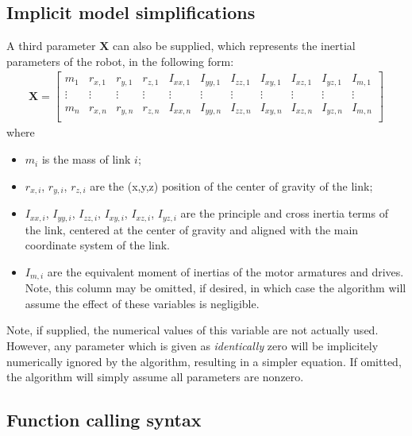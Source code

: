 \documentclass[12pt]{article}
\renewcommand{\b}[1]{\mathbf{#1}}
\begin{document}
\subsection{Implicit model simplifications}
A third parameter $\mathbf{X}$ can also be supplied, which represents the inertial parameters of the robot, in the following form:
\begin{align}
	\b{X} = \begin{bmatrix}
		m_1 & r_{x,1} & r_{y,1} & r_{z,1} & I_{xx,1} & I_{yy,1} & I_{zz,1} & I_{xy,1} & I_{xz,1} & I_{yz,1} & I_{m,1}\\
		\vdots &\vdots &\vdots &\vdots &\vdots &\vdots&\vdots&\vdots&\vdots&\vdots&\vdots\\
		m_n & r_{x,n} & r_{y,n} & r_{z,n} & I_{xx,n} & I_{yy,n} & I_{zz,n} & I_{xy,n} & I_{xz,n} & I_{yz,n} & I_{m,n}\\
	\end{bmatrix}
\end{align}
where
\begin{itemize}[nosep]
	\item $m_i$ is the mass of link $i$;
	\item $r_{x,i}$, $r_{y,i}$, $r_{z,i}$ are the (x,y,z) position of the center of gravity of the link;
	\item $I_{xx,i}$, $I_{yy,i}$, $I_{zz,i}$, $I_{xy,i}$, $I_{xz,i}$, $I_{yz,i}$ are the principle and cross inertia terms of the link, centered at the center of gravity and aligned with the main coordinate system of the link.
	\item $I_{m,i}$ are the equivalent moment of inertias of the motor armatures and drives. Note, this column may be omitted, if desired, in which case the algorithm will assume the effect of these variables is negligible.
\end{itemize}
Note, if supplied, the numerical values of this variable are not actually used. However, any parameter which is given as \textit{identically} zero will be implicitely numerically ignored by the algorithm, resulting in a simpler equation. If omitted, the algorithm will simply assume all parameters are nonzero.

\subsection{Function calling syntax}
\end{document}
